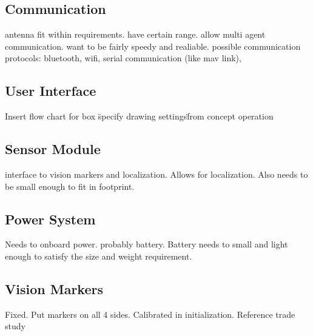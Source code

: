 \subsection{Communication}
\label{sec:subsystem_communication}
antenna fit within requirements. have certain range. allow multi agent communication. want to be fairly speedy and realiable. possible communication protocols: bluetooth, wifi, serial communication (like mav link),

\subsection{User Interface}
\label{sec:subsystem_ui}
Insert flow chart for box \"specify drawing settings\" from concept operation

\subsection{Sensor Module}
\label{sec:subsystem_sensors}
interface to vision markers and localization. Allows for localization. Also needs to be small enough to fit in footprint.

\subsection{Power System}
\label{sec:subsystem_power}
Needs to onboard power. probably battery. Battery needs to small and light enough to satisfy the size and weight requirement.

\subsection{Vision Markers}
\label{sec:subsystem_markers}
Fixed. Put markers on all 4 sides. Calibrated in initialization. Reference trade study